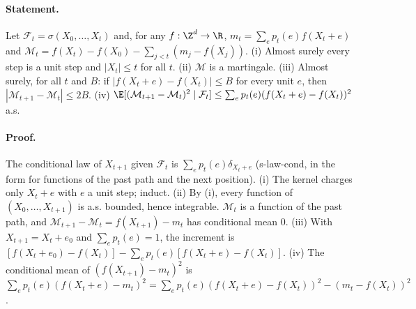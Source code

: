 \paragraph{Statement.} Let $\mathcal F_t=\sigma(X_0,\dots,X_t)$ and, for any $f:\Z^d\to\R$,
$m_t=\sum_ep_t(e)f(X_t+e)$ and $\mathcal M_t=f(X_t)-f(X_0)-\sum_{j<t}(m_j-f(X_j))$. (i) Almost surely every step
is a unit step and $|X_t|\leq t$ for all $t$. (ii) $\mathcal M$ is a martingale. (iii) Almost surely, for all
$t$ and $B$: if $|f(X_t+e)-f(X_t)|\leq B$ for every unit $e$, then $|\mathcal M_{t+1}-\mathcal M_t|\leq2B$.
(iv) $\E[(\mathcal M_{t+1}-\mathcal M_t)^2\mid\mathcal F_t]\leq\sum_ep_t(e)(f(X_t+e)-f(X_t))^2$ a.s.
\paragraph{Proof.} The conditional law of $X_{t+1}$ given $\mathcal F_t$ is $\sum_ep_t(e)\delta_{X_t+e}$
(s-law-cond, in the form for functions of the past path and the next position). (i) The kernel
charges only $X_t+e$ with $e$ a unit step; induct. (ii) By (i), every function of $(X_0,\dots,X_{t+1})$ is
a.s. bounded, hence integrable. $\mathcal M_t$ is a function of the past path, and
$\mathcal M_{t+1}-\mathcal M_t=f(X_{t+1})-m_t$ has conditional mean $0$. (iii) With $X_{t+1}=X_t+e_0$ and
$\sum_ep_t(e)=1$, the increment is
$[f(X_t+e_0)-f(X_t)]-\sum_ep_t(e)[f(X_t+e)-f(X_t)]$. (iv) The conditional mean of $(f(X_{t+1})-m_t)^2$ is
$\sum_ep_t(e)(f(X_t+e)-m_t)^2=\sum_ep_t(e)(f(X_t+e)-f(X_t))^2-(m_t-f(X_t))^2$.
